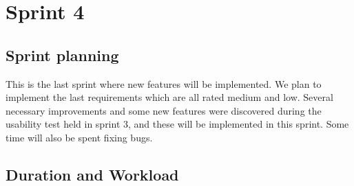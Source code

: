 \section{Sprint 4}

\subsection{Sprint planning}

	This is the last sprint where new features will be implemented. We plan to implement the last 
	requirements which are all rated medium and low. Several necessary improvements and some new 
	features were discovered during the usability test held in sprint 3, and these will be implemented 
	in this sprint. Some time will also be spent fixing bugs.

\subsection{Duration and Workload}

\clearpage

